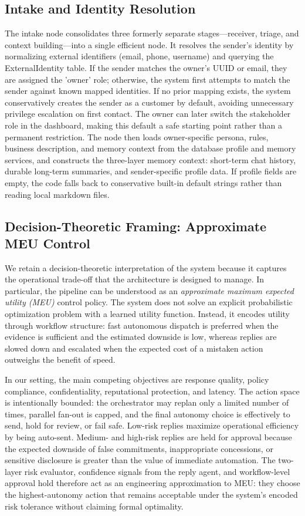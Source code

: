 \documentclass[11pt]{article}
\begin{document}
\subsection{Intake and Identity Resolution}
The intake node consolidates three formerly separate stages—receiver, triage, and context building—into a single efficient node. It resolves the sender's identity by normalizing external identifiers (email, phone, username) and querying the ExternalIdentity table. If the sender matches the owner's UUID or email, they are assigned the 'owner' role; otherwise, the system first attempts to match the sender against known mapped identities. If no prior mapping exists, the system conservatively creates the sender as a customer by default, avoiding unnecessary privilege escalation on first contact. The owner can later switch the stakeholder role in the dashboard, making this default a safe starting point rather than a permanent restriction. The node then loads owner-specific persona, rules, business description, and memory context from the database profile and memory services, and constructs the three-layer memory context: short-term chat history, durable long-term summaries, and sender-specific profile data. If profile fields are empty, the code falls back to conservative built-in default strings rather than reading local markdown files.

\subsection{Decision-Theoretic Framing: Approximate MEU Control}
We retain a decision-theoretic interpretation of the system because it captures the operational trade-off that the architecture is designed to manage. In particular, the pipeline can be understood as an \textit{approximate maximum expected utility (MEU)} control policy. The system does not solve an explicit probabilistic optimization problem with a learned utility function. Instead, it encodes utility through workflow structure: fast autonomous dispatch is preferred when the evidence is sufficient and the estimated downside is low, whereas replies are slowed down and escalated when the expected cost of a mistaken action outweighs the benefit of speed.

In our setting, the main competing objectives are response quality, policy compliance, confidentiality, reputational protection, and latency. The action space is intentionally bounded: the orchestrator may replan only a limited number of times, parallel fan-out is capped, and the final autonomy choice is effectively to send, hold for review, or fail safe. Low-risk replies maximize operational efficiency by being auto-sent. Medium- and high-risk replies are held for approval because the expected downside of false commitments, inappropriate concessions, or sensitive disclosure is greater than the value of immediate automation. The two-layer risk evaluator, confidence signals from the reply agent, and workflow-level approval hold therefore act as an engineering approximation to MEU: they choose the highest-autonomy action that remains acceptable under the system's encoded risk tolerance without claiming formal optimality.
\end{document}
